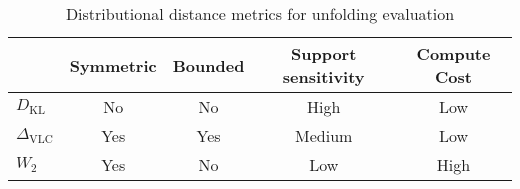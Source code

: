 \begin{table}
\centering
\caption{Distributional distance metrics for unfolding evaluation}
\label{tab:dist_metrics}
\begin{tabular}{lcccc}
\hline
 & Symmetric & Bounded & Support sensitivity & Compute Cost \\
\hline
\(D_{\textrm{KL}}\) & No & No & High & Low \\
\(\Delta_{\textrm{VLC}}\) & Yes & Yes & Medium & Low \\
\(W_2\) & Yes & No & Low & High \\
\hline
\end{tabular}
\end{table}